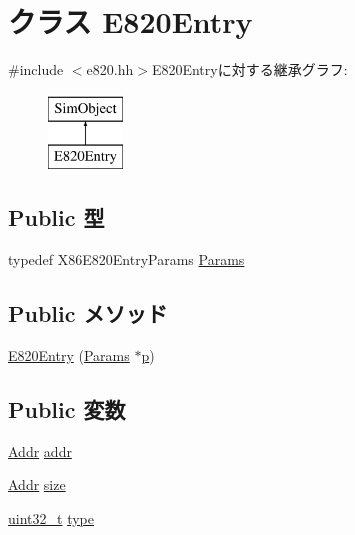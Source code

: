 \hypertarget{classX86ISA_1_1E820Entry}{
\section{クラス E820Entry}
\label{classX86ISA_1_1E820Entry}
}


{\ttfamily \#include $<$e820.hh$>$}E820Entryに対する継承グラフ:\begin{figure}[H]
\begin{center}
\leavevmode
\includegraphics[height=2cm]{classX86ISA_1_1E820Entry}
\end{center}
\end{figure}
\subsection*{Public 型}
\begin{DoxyCompactItemize}
\item 
typedef X86E820EntryParams \hyperlink{classX86ISA_1_1E820Entry_ad5894016e2d9b5f5b0742ecc076eb03a}{Params}
\end{DoxyCompactItemize}
\subsection*{Public メソッド}
\begin{DoxyCompactItemize}
\item 
\hyperlink{classX86ISA_1_1E820Entry_ac54f10a7fad50d9f67d7383e450d6a2a}{E820Entry} (\hyperlink{classX86ISA_1_1E820Entry_ad5894016e2d9b5f5b0742ecc076eb03a}{Params} $\ast$\hyperlink{namespaceX86ISA_af675c1d542a25b96e11164b80809a856}{p})
\end{DoxyCompactItemize}
\subsection*{Public 変数}
\begin{DoxyCompactItemize}
\item 
\hyperlink{base_2types_8hh_af1bb03d6a4ee096394a6749f0a169232}{Addr} \hyperlink{classX86ISA_1_1E820Entry_a0bb77b4ba61e408313e1118250f9278c}{addr}
\item 
\hyperlink{base_2types_8hh_af1bb03d6a4ee096394a6749f0a169232}{Addr} \hyperlink{classX86ISA_1_1E820Entry_a8ce507144b5ef53350af753eafb669f0}{size}
\item 
\hyperlink{Type_8hh_a435d1572bf3f880d55459d9805097f62}{uint32\_\-t} \hyperlink{classX86ISA_1_1E820Entry_ad44b615021ed3ccb734fcaf583ef4a03}{type}
\end{DoxyCompactItemize}


